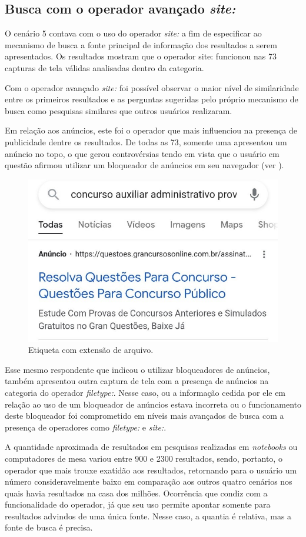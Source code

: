 \documentclass[portuguese]{textolivre}
\begin{document}
\subsection{Busca com o operador avançado \textit{site:}}\label{sec-links}
O cenário 5 contava com o uso do operador \textit{site:} a fim de especificar ao mecanismo de busca a fonte principal de informação dos resultados a serem apresentados. Os resultados mostram que o operador site: funcionou nas 73 capturas de tela válidas analisadas dentro da categoria.

Com o operador avançado \textit{site:} foi possível observar o maior nível de similaridade entre os primeiros resultados e as perguntas sugeridas pelo próprio mecanismo de busca como pesquisas similares que outros usuários realizaram.

Em relação aos anúncios, este foi o operador que mais influenciou na presença de publicidade dentre os resultados. De todas as 73, somente uma apresentou um anúncio no topo, o que gerou controvérsias tendo em vista que o usuário em questão afirmou utilizar um bloqueador de anúncios em seu navegador (ver ).

\begin{figure}[h!]
    \centering
    \includegraphics[width=0.6\linewidth]{fig-017.jpg}
    \caption{Etiqueta com extensão de arquivo.}
    \label{fig21}
\end{figure}

Esse mesmo respondente que indicou o utilizar bloqueadores de anúncios, também apresentou outra captura de tela com a presença de anúncios na categoria do operador \textit{filetype:}. Nesse caso, ou a informação cedida por ele em relação ao uso de um bloqueador de anúncios estava incorreta ou o funcionamento deste bloqueador foi comprometido em níveis mais avançados de busca com a presença de operadores como \textit{filetype:} e \textit{site:}.

A quantidade aproximada de resultados em pesquisas realizadas em \textit{notebooks} ou computadores de mesa variou entre 900 e 2300 resultados, sendo, portanto, o operador que mais trouxe exatidão aos resultados, retornando para o usuário um número consideravelmente baixo em comparação aos outros quatro cenários nos quais havia resultados na casa dos milhões. Ocorrência que condiz com a funcionalidade do operador, já que seu uso permite apontar somente para resultados advindos de uma única fonte. Nesse caso, a quantia é relativa, mas a fonte de busca é precisa.
\end{document}
